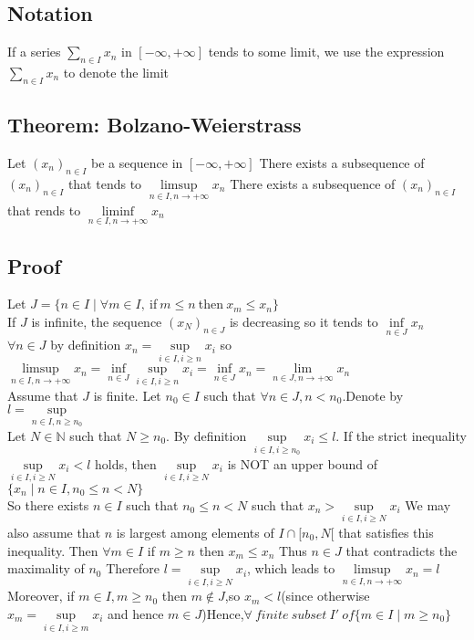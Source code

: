 \documentclass{book}
\begin{document}
\subsection{Notation}
If a series $\sum\limits_{n\in I}x_n$ in $[-\infty,+\infty]$ tends to some limit, we use the expression $\sum\limits_{n\in I}x_n$ to denote the limit
\subsection{Theorem: Bolzano-Weierstrass}
Let $(x_n)_{n\in I}$ be a sequence in $[-\infty,+\infty]$ There exists a subsequence of $(x_n)_{n\in I}$ that tends to $\limsup\limits_{n\in I,n\rightarrow +\infty}x_n$ There exists a subsequence of $(x_n)_{n\in I}$ that rends to $\liminf\limits_{n\in I,n\rightarrow +\infty}x_n$
\subsection{Proof}
Let $J=\{n\in I\mid\forall m\in I,\ $if$\ m\leq n\ $then$\ x_m\leq x_n\}$\\
\indent If $J$ is infinite, the sequence $(x_N)_{n\in J}$ is decreasing so it tends to $\inf\limits_{n\in J}x_n$\\
\indent $\forall n\in J$ by definition $x_n=\sup\limits_{i\in I,i\geq n}x_i$ so $\limsup\limits_{n\in I,n\rightarrow+\infty}x_n=\inf\limits_{n\in J}\sup\limits_{i\in I,i\geq n}x_i=\inf\limits_{n\in J}x_n=\lim\limits_{n\in J,n\rightarrow+\infty}x_n$\\
\indent Assume that $J$ is finite. Let $n_0\in I$ such that $\forall n\in J,n<n_0$.Denote by $l=\sup\limits_{n\in I,n\geq n_0}$\\\indent 
Let $N\in\mathbb{N}$ such that $N\geq n_0$. By definition $\sup\limits_{i\in  I,i\geq n_0}x_i\leq l$. If the strict inequality $\sup\limits_{i\in I,i\geq N}x_i<l$ holds, then $\sup\limits_{i\in I,i\geq N}x_i$ is NOT an upper bound of $\{x_n\mid n\in I,n_0\leq n<N\}$\\\indent 
So there exists $n\in I$ such that $n_0\leq n<N$ such that $x_n>\sup\limits_{i\in I,i\geq N}x_i$ We may also assume that $n $ is largest among elements of {$I\cap[n_0,N[$} that satisfies this inequality. Then $\forall m\in I$ if $m\geq n$ then $x_m\leq x_n$ Thus $n\in J$ that contradicts the maximality of $n_0$ Therefore $l=\sup\limits_{i\in I,i\geq N}x_i$, which leads to $\limsup\limits_{n\in I,n\rightarrow+\infty}x_n=l$\\\indent 
Moreover, if $m\in I,m\geq n_0$ then $m\not\in J$,so $x_m<l$(since otherwise $x_m=\sup\limits_{i\in I,i\geq m}x_i$ and hence $m\in J$)Hence,$\forall\ finite\ subset\ I'\ of\{m\in I\mid m\geq n_0\}$\\\indent 
\end{document}
